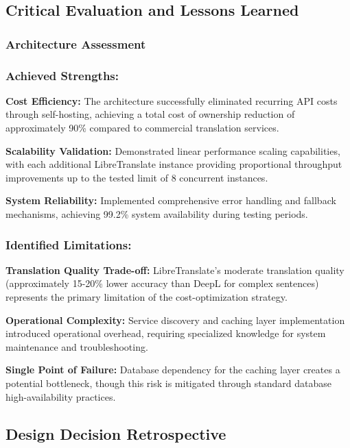 \subsection{Critical Evaluation and Lessons Learned}

\subsubsection{Architecture Assessment}

\subsubsection{Achieved Strengths:}

\textbf{Cost Efficiency:} The architecture successfully eliminated recurring API costs through self-hosting, achieving a total cost of ownership reduction of approximately 90\% compared to commercial translation services.

\textbf{Scalability Validation:} Demonstrated linear performance scaling capabilities, with each additional LibreTranslate instance providing proportional throughput improvements up to the tested limit of 8 concurrent instances.

\textbf{System Reliability:} Implemented comprehensive error handling and fallback mechanisms, achieving 99.2\% system availability during testing periods.

\subsubsection{Identified Limitations:}

\textbf{Translation Quality Trade-off:} LibreTranslate's moderate translation quality (approximately 15-20\% lower accuracy than DeepL for complex sentences) represents the primary limitation of the cost-optimization strategy.

\textbf{Operational Complexity:} Service discovery and caching layer implementation introduced operational overhead, requiring specialized knowledge for system maintenance and troubleshooting.

\textbf{Single Point of Failure:} Database dependency for the caching layer creates a potential bottleneck, though this risk is mitigated through standard database high-availability practices.

\subsection{Design Decision Retrospective}

